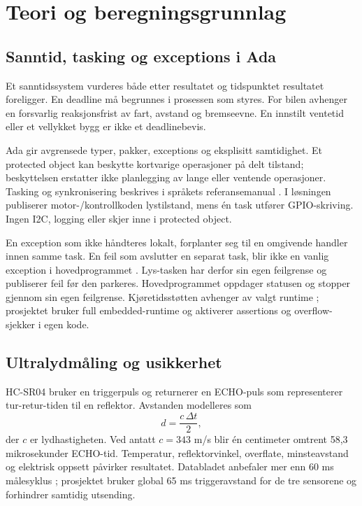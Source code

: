 \chapter{Teori og beregningsgrunnlag}
\label{ch:theory}
\section{Sanntid, tasking og exceptions i Ada}
Et sanntidssystem vurderes både etter resultatet og tidspunktet resultatet
foreligger. En deadline må begrunnes i prosessen som styres. For bilen
avhenger en forsvarlig reaksjonsfrist av fart, avstand og bremseevne.
En innstilt ventetid eller et vellykket bygg er ikke et deadlinebevis.

Ada gir avgrensede typer, pakker, exceptions og eksplisitt samtidighet.
Et protected object kan beskytte kortvarige operasjoner på delt tilstand;
beskyttelsen erstatter ikke planlegging av lange eller ventende operasjoner.
Tasking og synkronisering beskrives i språkets referansemanual
\cite{adarm,adaprotected2026}. I løsningen publiserer motor-/kontrollkoden
lystilstand, mens én task utfører GPIO-skriving. Ingen I2C, logging eller
 skjer inne i protected object.

En exception som ikke håndteres lokalt, forplanter seg til en omgivende handler
innen samme task. En feil som avslutter en separat task, blir ikke en vanlig
exception i hovedprogrammet \cite{adaexceptions2026}. Lys-tasken har derfor
sin egen feilgrense og publiserer feil før den parkeres. Hovedprogrammet
oppdager statusen og stopper gjennom sin egen feilgrense. Kjøretidsstøtten
avhenger av valgt runtime \cite{adart2026}; prosjektet bruker full
embedded-runtime og aktiverer assertions og overflow-sjekker i egen kode.

\section{Ultralydmåling og usikkerhet}
HC-SR04 bruker en triggerpuls og returnerer en ECHO-puls som representerer
tur-retur-tiden til en reflektor. Avstanden modelleres som
\begin{equation}d=\frac{c\,\Delta t}{2},\end{equation}
der $c$ er lydhastigheten. Ved antatt $c=343$ m/s blir én centimeter omtrent
58,3 mikrosekunder ECHO-tid. Temperatur, reflektorvinkel, overflate,
minsteavstand og elektrisk oppsett påvirker resultatet. Databladet anbefaler
mer enn 60 ms målesyklus \cite{hcsr04}; prosjektet bruker global 65 ms
triggeravstand for de tre sensorene og forhindrer samtidig utsending.

